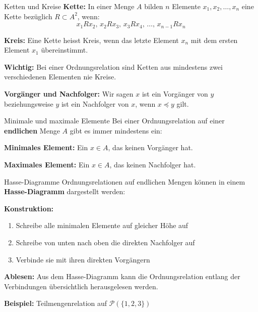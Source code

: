 \documentclass[a4paper, fontsize=7pt]{scrartcl}
\begin{document}
\begin{mainbox}{Ketten und Kreise}
\textbf{Kette:}
In einer Menge $A$ bilden $n$ Elemente $x_1, x_2, \ldots, x_n$ eine Kette bez\"uglich $R \subset A^2$, wenn:
$$x_1 R x_2, \, x_2 R x_3, \, x_3 R x_4, \, \ldots, \, x_{n-1} R x_n$$

\textbf{Kreis:}
Eine Kette heisst Kreis, wenn das letzte Element $x_n$ mit dem ersten Element $x_1$ \"ubereinstimmt.

\textbf{Wichtig:}
Bei einer Ordnungsrelation sind Ketten aus mindestens zwei verschiedenen Elementen nie Kreise.

\textbf{Vorg\"anger und Nachfolger:}
Wir sagen $x$ ist ein Vorg\"anger von $y$ beziehungsweise $y$ ist ein Nachfolger von $x$, wenn $x \preceq y$ gilt.
\end{mainbox}

\begin{mainbox}{Minimale und maximale Elemente}
Bei einer Ordnungsrelation auf einer \textbf{endlichen} Menge $A$ gibt es immer mindestens ein:

\textbf{Minimales Element:}
Ein $x \in A$, das keinen Vorg\"anger hat.

\textbf{Maximales Element:}
Ein $x \in A$, das keinen Nachfolger hat.
\end{mainbox}

\begin{subbox}{Hasse-Diagramme}
Ordnungsrelationen auf endlichen Mengen k\"onnen in einem \textbf{Hasse-Diagramm} dargestellt werden:

\textbf{Konstruktion:}
\begin{enumerate}
    \item Schreibe alle minimalen Elemente auf gleicher H\"ohe auf
    \item Schreibe von unten nach oben die direkten Nachfolger auf
    \item Verbinde sie mit ihren direkten Vorg\"angern
\end{enumerate}

\textbf{Ablesen:}
Aus dem Hasse-Diagramm kann die Ordnungsrelation entlang der Verbindungen \"ubersichtlich herausgelesen werden.

\textbf{Beispiel:} Teilmengenrelation auf $\mathcal{P}(\{1, 2, 3\})$
\begin{center}
\end{center}
\end{subbox}
\end{document}
